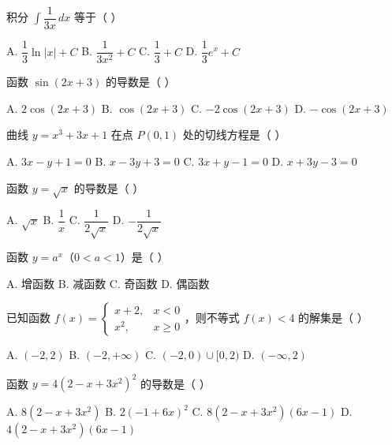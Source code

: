 \documentclass[11pt, a4paper]{article}
\begin{document}
\begin{baitap}[30]
积分 $\displaystyle\int \dfrac{1}{3x}\,dx$ 等于（ ）
\par\vspace{3pt}
\noindent A. $\dfrac{1}{3}\ln\lvert x\rvert+C$ \quad B. $\dfrac{1}{3x^2}+C$ \quad C. $\dfrac{1}{3}+C$ \quad D. $\dfrac{1}{3}e^x+C$
\end{baitap}

\begin{baitap}[31]
函数 $\sin(2x+3)$ 的导数是（ ）
\par\vspace{3pt}
\noindent A. $2\cos(2x+3)$ \quad B. $\cos(2x+3)$ \quad C. $-2\cos(2x+3)$ \quad D. $-\cos(2x+3)$
\end{baitap}

\begin{baitap}[32]
曲线 $y=x^3+3x+1$ 在点 $P(0,1)$ 处的切线方程是（ ）
\par\vspace{3pt}
\noindent A. $3x-y+1=0$ \quad B. $x-3y+3=0$ \quad C. $3x+y-1=0$ \quad D. $x+3y-3=0$
\end{baitap}

\begin{baitap}[33]
函数 $y=\sqrt{x}$ 的导数是（ ）
\par\vspace{3pt}
\noindent A. $\sqrt{x}$ \quad B. $\dfrac{1}{x}$ \quad C. $\dfrac{1}{2\sqrt{x}}$ \quad D. $-\dfrac{1}{2\sqrt{x}}$
\end{baitap}

\begin{baitap}[34]
函数 $y=a^x$（$0<a<1$）是（ ）
\par\vspace{3pt}
\noindent A. 增函数 \quad B. 减函数 \quad C. 奇函数 \quad D. 偶函数
\end{baitap}

\begin{baitap}[35]
已知函数 $f(x)=\begin{cases} x+2, & x<0 \\ x^2, & x\ge0 \end{cases}$，则不等式 $f(x)<4$ 的解集是（ ）
\par\vspace{3pt}
\noindent A. $(-2,2)$ \quad B. $(-2,+\infty)$ \quad C. $(-2,0)\cup[0,2)$ \quad D. $(-\infty,2)$
\end{baitap}

\begin{baitap}[36]
函数 $y=4(2-x+3x^2)^2$ 的导数是（ ）
\par\vspace{3pt}
\noindent A. $8(2-x+3x^2)$ \quad B. $2(-1+6x)^2$ \quad C. $8(2-x+3x^2)(6x-1)$ \quad D. $4(2-x+3x^2)(6x-1)$
\end{baitap}
\end{document}

